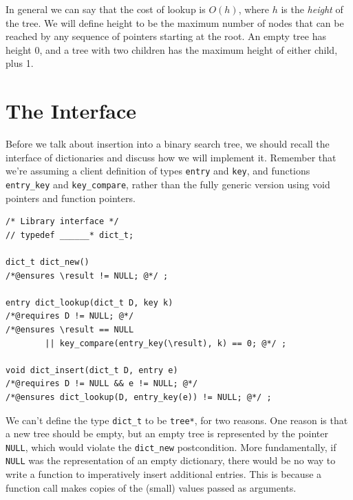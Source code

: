 In general we can say that the cost of lookup is $O(h)$, where $h$ is
the \emph{height} of the tree. We will define height to be the maximum
number of nodes that can be reached by any sequence of pointers
starting at the root. An empty tree has height 0, and a tree with two
children has the maximum height of either child, plus 1.



\section{The Interface}
\label{sec:bst:interface}

Before we talk about insertion into a binary search tree, we should
recall the interface of dictionaries and discuss how we will implement
it.  Remember that we're assuming a client definition of types
\lstinline'entry' and \lstinline'key', and functions
\lstinline'entry_key' and \lstinline'key_compare', rather than the
fully generic version using void pointers and function pointers.

\begin{lstlisting}[language={[C0]C}]
/* Library interface */
// typedef ______* dict_t;

dict_t dict_new()
/*@ensures \result != NULL; @*/ ;

entry dict_lookup(dict_t D, key k)
/*@requires D != NULL; @*/
/*@ensures \result == NULL
        || key_compare(entry_key(\result), k) == 0; @*/ ;

void dict_insert(dict_t D, entry e)
/*@requires D != NULL && e != NULL; @*/
/*@ensures dict_lookup(D, entry_key(e)) != NULL; @*/ ;
\end{lstlisting}

We can't define the type \lstinline'dict_t' to be \lstinline'tree*',
for two reasons.  One reason is that a new tree should be empty, but
an empty tree is represented by the pointer \lstinline'NULL', which
would violate the \lstinline'dict_new' postcondition.  More
fundamentally, if \lstinline'NULL' was the representation of an empty
dictionary, there would be no way to write a function to imperatively
insert additional entries.  This is because a function call makes
copies of the (small) values passed as arguments.

